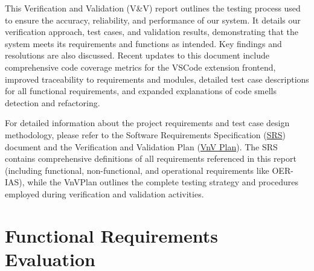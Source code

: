 \documentclass[12pt, titlepage]{article}
\begin{document}

\newpage

\tableofcontents

\listoftables %

\listoffigures %

\newpage


\newcommand{\SRS}{\href{https://github.com/ssm-lab/capstone--source-code-optimizer/blob/main/docs/SRS/SRS.pdf}{SRS}}
\newcommand{\VnVPlan}{\href{https://github.com/ssm-lab/capstone--source-code-optimizer/blob/main/docs/VnVPlan/VnVPlan.pdf}{VnV Plan}}

\noindent This Verification and Validation (V\&V) report outlines the testing
process used to ensure the accuracy, reliability, and performance of
our system. It details our verification approach, test cases, and
validation results, demonstrating that the system meets its
requirements and functions as intended. Key findings and resolutions
are also discussed. Recent updates to this document include comprehensive code coverage metrics for the VSCode extension frontend, improved traceability to requirements and modules, detailed test case descriptions for all functional requirements, and expanded explanations of code smells detection and refactoring.

\noindent For detailed information about the project requirements and test case design methodology, please refer to the Software Requirements Specification (\SRS) document and the Verification and Validation Plan (\VnVPlan). The SRS contains comprehensive definitions of all requirements referenced in this report (including functional, non-functional, and operational requirements like OER-IAS), while the VnVPlan outlines the complete testing strategy and procedures employed during verification and validation activities.

\section{Functional Requirements Evaluation}
\end{document}
